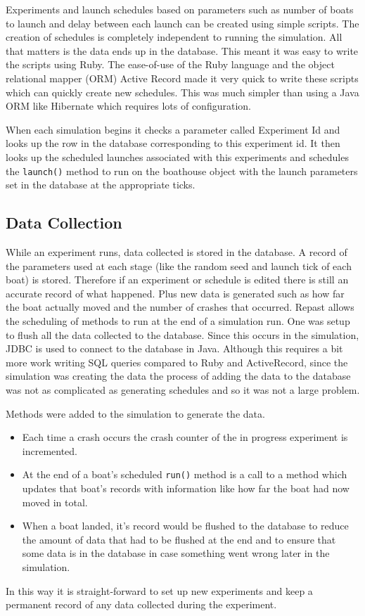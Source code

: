   Experiments and launch schedules based on parameters such as number of boats to launch and delay between each launch can be created using simple scripts. The creation of schedules is completely independent to running the simulation. All that matters is the data ends up in the database. This meant it was easy to write the scripts using Ruby. The ease-of-use of the Ruby language and the object relational mapper (ORM) Active Record made it very quick to write these scripts which can quickly create new schedules. This was much simpler than using a Java ORM like Hibernate which requires lots of configuration.
  
  When each simulation begins it checks a parameter called Experiment Id and looks up the row in the database corresponding to this experiment id. It then looks up the scheduled launches associated with this experiments and schedules the \texttt{launch()} method to run on the boathouse object with the launch parameters set in the database at the appropriate ticks.
  
  \subsection{Data Collection}
  While an experiment runs, data collected is stored in the database. A record of the parameters used at each stage (like the random seed and launch tick of each boat) is stored. Therefore if an experiment or schedule is edited there is still an accurate record of what happened. Plus new data is generated such as how far the boat actually moved and the number of crashes that occurred. Repast allows the scheduling of methods to run at the end of a simulation run. One was setup to flush all the data collected to the database. Since this occurs in the simulation, JDBC is used to connect to the database in Java. Although this requires a bit more work writing SQL queries compared to Ruby and ActiveRecord, since the simulation was creating the data the process of adding the data to the database was not as complicated as generating schedules and so it was not a large problem.
  
  Methods were added to the simulation to generate the data.
  \begin{itemize}
    \item Each time a crash occurs the crash counter of the in progress experiment is incremented.
    \item At the end of a boat's scheduled \texttt{run()} method is a call to a method which updates that boat's records with information like how far the boat had now moved in total.
    \item When a boat landed, it's record would be flushed to the database to reduce the amount of data that had to be flushed at the end and to ensure that some data is in the database in case something went wrong later in the simulation.
  \end{itemize}
  
  In this way it is straight-forward to set up new experiments and keep a permanent record of any data collected during the experiment.

